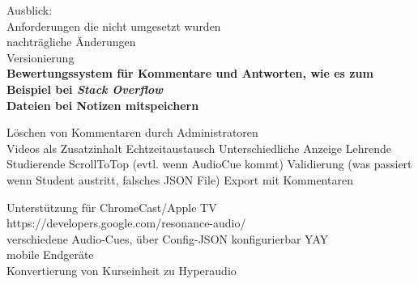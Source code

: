 Ausblick:\\
Anforderungen die nicht umgesetzt wurden\\


nachträgliche Änderungen\\
Versionierung\\
\textbf{Bewertungssystem für Kommentare und Antworten, wie es zum Beispiel bei \textit{Stack Overflow}\\
Dateien bei Notizen mitspeichern}

Löschen von Kommentaren durch Administratoren\\
Videos als Zusatzinhalt
Echtzeitaustausch
Unterschiedliche Anzeige Lehrende Studierende
ScrollToTop (evtl. wenn AudioCue kommt)
Validierung (was passiert wenn Student austritt, falsches JSON File)
Export mit Kommentaren

Unterstützung für ChromeCast/Apple TV\\
https://developers.google.com/resonance-audio/\\
verschiedene Audio-Cues, über Config-JSON konfigurierbar YAY\\
mobile Endgeräte\\
Konvertierung von Kurseinheit zu Hyperaudio\\